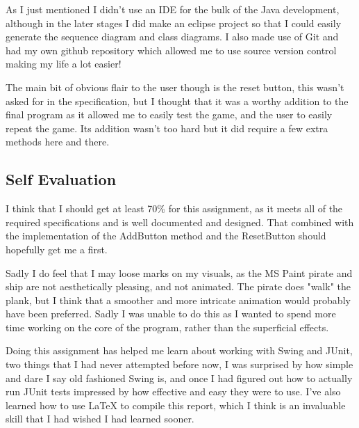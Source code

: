 \documentclass[notitlepage]{report}
\begin{document}
As I just mentioned I didn't use an IDE for the bulk of the Java development, although in the later stages I did make an eclipse project so that I could easily generate the sequence diagram and class diagrams. I also made use of Git and had my own github repository which allowed me to use source version control making my life a lot easier!

The main bit of obvious flair to the user though is the reset button, this wasn't asked for in the specification, but I thought that it was a worthy addition to the final program as it allowed me to easily test the game, and the user to easily repeat the game. Its addition wasn't too hard but it did require a few extra methods here and there. 


\subsection{Self Evaluation}
I think that I should get at least 70\% for this assignment, as it meets all of the required specifications and is well documented and designed. That combined with the implementation of the AddButton method and the ResetButton should hopefully get me a first. 

Sadly I do feel that I may loose marks on my visuals, as the MS Paint pirate and ship are not aesthetically pleasing, and not animated. The pirate does "walk" the plank, but I think that a smoother and more intricate animation would probably have been preferred. Sadly I was unable to do this as I wanted to spend more time working on the core of the program, rather than the superficial effects.

Doing this assignment has helped me learn about working with Swing and JUnit, two things that I had never attempted before now, I was surprised by how simple and dare I say old fashioned Swing is, and once I had figured out how to actually run JUnit tests impressed by how effective and easy they were to use. I've also learned how to use LaTeX to compile this report, which I think is an invaluable skill that I had wished I had learned sooner.
\end{document}
